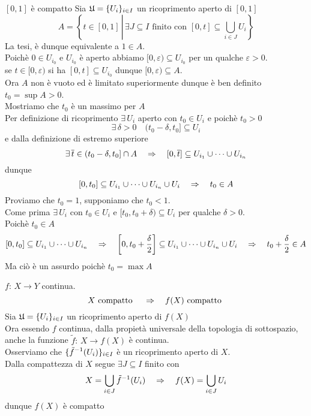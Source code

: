 \begin{thm}$[0,1]$ \`e compatto
\proof Sia $\mathfrak{U}= \{ U_i\}_{i \in I } $ un ricoprimento aperto di $[0,1]$
$$ A=\left\{   t \in [0,1] \, \left | \, \exists J \subseteq I \text{ finito con } [0,t] \subseteq \bigcup_{i \in J } U_i \right\} \right.$$
La tesi, \`e dunque equivalente a $1\in A$.\\
Poich\`e $0\in U_{i_0}$ e $U_{i_0}$ \`e aperto abbiamo $[0,\varepsilon) \subseteq U_{i_0}$ per un qualche $\varepsilon>0$.\\
se $t\in [0,\varepsilon)$ si ha $[0,t]\subseteq U_{i_0}$  dunque $[0,\varepsilon) \subseteq A$.\\
Ora $A$ non \`e vuoto ed \`e limitato superiormente dunque \`e ben definito $t_0=\sup A>0$.\\
Mostriamo che $t_0$ \`e un massimo per $A$\\
Per definizione di ricoprimento 
$ \exists\, U_{i} $ aperto con  $ t_0 \in U_i  $ e poich\`e $t_0>0$
$$\exists\, \delta >0 \quad (t_0 -\delta , t_0] \subseteq U_i $$
e dalla definizione di estremo superiore
$$ \exists \,\overline{t} \in (t_0-\delta, t_0] \cap A \quad \Rightarrow \quad [0, \overline{t}] \subseteq U_{i_1} \cup \cdots \cup U_{i_n}$$
dunque 
$$ [0,t_0] \subseteq U_{i_1} \cup \cdots \cup U_{i_n} \cup U_i \quad \Rightarrow \quad t_0\in A   $$
Proviamo che $t_0=1$, supponiamo che $t_0<1$.\\
Come prima $\exists \, U_i $ con $t_0\in U_i$ e $[t_0, t_0+\delta) \subseteq U_i $ per qualche $\delta>0$.\\
Poich\`e $t_0 \in A$ 
$$ [0,t_0] \subseteq U_{i_1} \cup \cdots \cup U_{i_n} \quad \Rightarrow \quad  \left[ 0 , t_0 + \frac{\delta}{2}\right] \subseteq U_{i_1}\cup \cdots \cup U_{i_n} \cup U_i \quad \Rightarrow \quad t_0 +\frac{\delta}{2} \in A $$
Ma ci\`o \`e un assurdo poich\`e $t_0 =\max A$\\
\endproof
\end{thm}
\spazio
\begin{thm}$f:\, X \to Y $ continua.
$$ X \text{ compatto } \quad \Rightarrow \quad f(X) \text{ compatto }$$
\proof  Sia $\displaystyle \mathfrak{U}=\{ U_i \}_{i \in I } $ un ricoprimento aperto di $f(X)$\\
Ora essendo $f$ continua, dalla propiet\`a universale della topologia di sottospazio, anche la funzione $\tilde{f}:\, X \to f(X)$ \`e continua.\\
Osserviamo che $\displaystyle \{ \tilde{f}^{-1} (U_i) \}_{i \in I} $ \`e un ricoprimento aperto di $X$.\\
Dalla compattezza di $X$ segue $\exists J \subseteq I$ finito con
$$ X = \bigcup_{i \in J } \tilde{f}^{-1}(U_i) \quad \Rightarrow \quad f(X) =\bigcup_{i \in J } U_i $$
dunque $f(X)$ \`e compatto
\end{thm}
